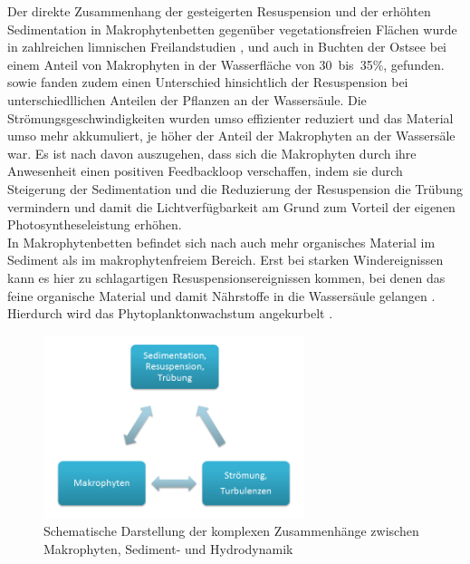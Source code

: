 Der direkte Zusammenhang der gesteigerten Resuspension und der erhöhten Sedimentation in Makrophytenbetten gegenüber vegetationsfreien Flächen wurde in zahlreichen limnischen Freilandstudien \citep{horppila_2003, horppila_2005}, und auch in Buchten der Ostsee \citep{kaitaranta_2013} bei einem Anteil von Makrophyten in der Wasserfläche von \unit{30 bis 35}{\%}, gefunden.\\ 
\cite{ward_1984} sowie \cite{fonseca_1986} fanden zudem einen Unterschied hinsichtlich der Resuspension bei unterschiedllichen Anteilen der Pflanzen an der Wassersäule. Die Strömungsgeschwindigkeiten wurden umso effizienter reduziert und das Material umso mehr akkumuliert, je höher der Anteil der Makrophyten an der Wassersäle war. Es ist nach \cite{madsen_2001} davon auszugehen, dass sich die Makrophyten durch ihre Anwesenheit einen positiven Feedbackloop verschaffen, indem sie durch Steigerung der Sedimentation und die Reduzierung der Resuspension die Trübung vermindern und damit die Lichtverfügbarkeit am Grund zum Vorteil der eigenen Photosyntheseleistung erhöhen.\\
In Makrophytenbetten befindet sich nach \cite{kenworthy_1982} auch mehr organisches Material im Sediment als im makrophytenfreiem Bereich. Erst bei starken Windereignissen kann es hier zu schlagartigen Resuspensionsereignissen kommen, bei denen das feine organische Material und damit Nährstoffe in die Wassersäule gelangen \citep{dauby_1995}. Hierdurch wird das Phytoplanktonwachstum angekurbelt \citep{cowan_1996}.\\

\begin{figure}[htb]
\centering
\includegraphics[width=0.68\textwidth]{images/Schema_Pfl_Sedim_Strm}
\caption[Zusammenhänge zwischen Makrophyten, Sediment- und Hydrodynamik]{Schematische Darstellung der komplexen Zusammenhänge zwischen Makrophyten, Sediment- und Hydrodynamik}
\label{fig:schema_Makrophyten,Sedimente,Hydrodynamik}
\end{figure}
\\

